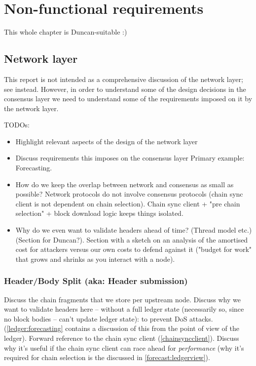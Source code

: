\chapter{Non-functional requirements}
\label{nonfunctional}

This whole chapter is Duncan-suitable :)
\duncan

\section{Network layer}
\label{nonfunctional:network}

This report is not intended as a comprehensive discussion of the network layer;
see \cite{network-spec} instead. However, in order to understand
some of the design decisions in the consensus layer we need to understand some
of the requirements imposed on it by the network layer.

TODOs:

\begin{itemize}
\item Highlight relevant aspects of the design of the network layer
\item Discuss requirements this imposes on the consensus layer
Primary example: Forecasting.
\item How do we keep the overlap between network and consensus as small
as possible? Network protocols do not involve consensus protocols
(chain sync client is not dependent on chain selection). Chain sync
client + "pre chain selection" + block download logic keeps things isolated.
\item Why do we even want to validate headers ahead of time? (Thread model etc.)
(Section for Duncan?).
Section with a sketch on an analysis of the amortised cost for attackers versus
our own costs to defend against it ("budget for work" that grows and shrinks
as you interact with a node).
\end{itemize}

\subsection{Header/Body Split (aka: Header submission)}
\label{nonfunctional:network:headerbody}

Discuss the chain fragments that we store per upstream node.
Discuss why we want to validate headers here -- without a full ledger state
(necessarily so, since no block bodies -- can't update ledger state): to prevent
DoS attacks.
(\cref{ledger:forecasting} contains a discussion of this from the point of view of
the ledger).
Forward reference to the chain sync client (\cref{chainsyncclient}).
Discuss why it's useful if the chain sync client can race ahead  for
\emph{performance} (why it's required for chain selection is the discussed in
\cref{forecast:ledgerview}).

